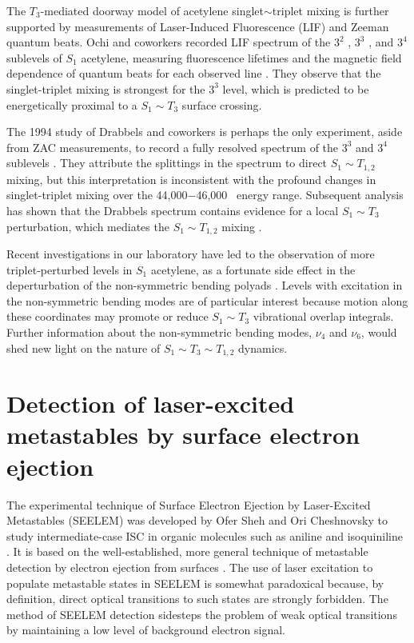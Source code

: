 The $T_3$-mediated doorway model of acetylene singlet$\sim$triplet
mixing is further supported by measurements of Laser-Induced
Fluorescence (LIF) and Zeeman quantum beats.  Ochi and coworkers
recorded LIF spectrum of the $3^2$ , $3^3$ , and $3^4$
 sublevels of $S_1$ acetylene, measuring fluorescence lifetimes
and the magnetic field dependence of quantum beats for each observed
line \cite{ochi91}.  They observe that the singlet-triplet mixing is
strongest for the $3^3$  level, which is predicted to be
energetically proximal to a $S_1 \sim T_3$ surface crossing.

The 1994 study of Drabbels and coworkers is perhaps the only
experiment, aside from ZAC measurements, to record a fully resolved
spectrum of the $3^3$  and $3^4$  sublevels
\cite{drabbels94}.  They attribute the splittings in the spectrum to
direct $S_1 \sim T_{1,2}$ mixing, but this interpretation is
inconsistent with the profound changes in singlet-triplet mixing over
the 44,000$-$46,000 \rcm\ energy range.  Subsequent analysis has shown
that the Drabbels spectrum contains evidence for a local $S_1 \sim
T_3$ perturbation, which mediates the $S_1 \sim T_{1,2}$ mixing
\cite{altunata01}.

Recent investigations in our laboratory have led to the observation of
more triplet-perturbed levels in $S_1$ acetylene, as a fortunate side
effect in the deperturbation of the non-symmetric bending polyads
\cite{merer08, steeves08}.  Levels with excitation in the
non-symmetric bending modes are of particular interest because motion
along these coordinates may promote or reduce $S_1 \sim T_3$
vibrational overlap integrals.  Further information about the
non-symmetric bending modes, $\nu_4$ and $\nu_6$, would shed new light
on the nature of $S_1 \sim T_3 \sim T_{1,2}$ dynamics.

\section{Detection of laser-excited metastables by surface electron
  ejection}

The experimental technique of Surface Electron Ejection by
Laser-Excited Metastables (SEELEM) was developed by Ofer Sheh and Ori
Cheshnovsky to study intermediate-case ISC in organic molecules such
as aniline and isoquiniline \cite{sneh86, sneh88, sneh89a, sneh89b,
  sneh91}.  It is based on the well-established, more general
technique of metastable detection by electron ejection from surfaces
\cite{hotop96}.  The use of laser excitation to populate metastable
states in SEELEM is somewhat paradoxical because, by definition,
direct optical transitions to such states are strongly forbidden.  The
method of SEELEM detection sidesteps the problem of weak optical
transitions by maintaining a low level of background electron signal.

